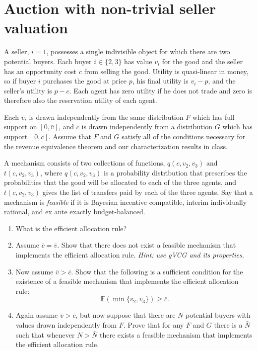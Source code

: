 \documentclass[a4paper]{article}
\begin{document}
\fi



\section{Auction with non-trivial seller valuation}
A seller, $i=1$, possesses a single indivisible object for which there are two potential buyers. Each buyer $i \in \{2,3\}$ has value $v_i$ for the good and the seller has an opportunity cost $c$ from selling the good.  Utility is quasi-linear in money, so if buyer $i$ purchases the good at price $p$, his final utility is $v_i-p$, and the seller's utility is $p-c$. Each agent has zero utility if he does not trade and zero is therefore also the reservation utility of each agent.

Each $v_i$ is drawn independently from the same distribution $F$ which has full support on $[0,\bar v]$, and $c$ is drawn independently from a distribution $G$ which has support $[0,\bar c]$.  Assume that $F$ and $G$ satisfy all of the conditions necessary for the revenue
equivalence theorem and our characterization results in class.

\medskip
A mechanism consists of two collections of functions, $q(c, v_2, v_3)$ and $t(c, v_2, v_3)$, where $q(c, v_2, v_3)$ is a probability distribution that prescribes the probabilities that the good will be allocated to each of the three agents, and $t(c, v_2, v_3)$ gives the list of transfers paid by each of the three agents.
Say that a mechanism is \emph{feasible} if it is Bayesian incentive compatible, interim individually rational, and ex ante exactly budget-balanced.

\begin{enumerate}
	\item What is the efficient allocation rule?
	
	\item Assume $\bar c = \bar v$.  Show that there does not exist a feasible mechanism that implements the efficient allocation rule. \emph{Hint: use gVCG and its properties.}
	
	\item Now assume $\bar v > \bar c$.  Show that the following is a sufficient condition for the existence of a feasible mechanism that implements the efficient allocation rule:
	$$ \mathbb{E}(\min\{v_2, v_3\}) \geq \bar c. $$
	\item Again assume $\bar{v} > \bar{c}$, but now suppose that there are $N$ potential buyers with values drawn independently from $F$.  Prove that for any $F$ and $G$ there is a $\bar N$ such that whenever $N > \bar{N}$  there exists a feasible mechanism that
	implements the efficient allocation rule.
\end{enumerate}
\end{document}
